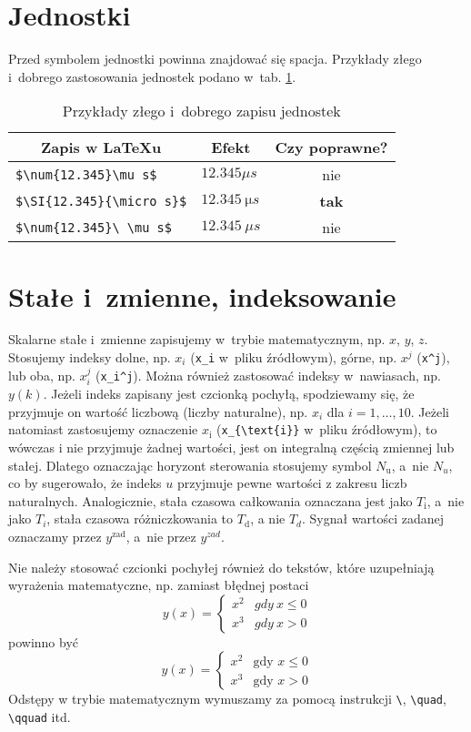 \section{Jednostki}
Przed symbolem jednostki powinna znajdować się spacja. Przykłady złego i~dobrego zastosowania jednostek podano w~tab. \ref{t_jednostki}.

\begin{table}[H]
	\caption{Przykłady złego i~dobrego zapisu jednostek}
	\label{t_jednostki}
\centering
\begin{tabular}{llc}
	\multicolumn{1}{c}{Zapis w \LaTeX u} & \multicolumn{1}{c}{Efekt} & \multicolumn{1}{c}{Czy poprawne?} \\ \hline
	\verb+$\num{12.345}\mu s$+ & $\num{12.345}\mu s$ & nie \\
	\verb+$\SI{12.345}{\micro s}$+ & $\SI{12.345}{\micro s}$ & \textbf{tak} \\
	\verb+$\num{12.345}\ \mu s$+ & $\num{12.345}\ \mu s$ & nie \\
\end{tabular}
\end{table}

\section{Stałe i~zmienne, indeksowanie}
Skalarne stałe i~zmienne zapisujemy w~trybie matematycznym, np. $x$, $y$, $z$. Stosujemy indeksy dolne, np. $x_i$ (\verb|x_i| w~pliku źródłowym), górne, np. $x^j$ (\verb|x^j|), lub oba, np. $x_i^j$ (\verb|x_i^j|). Można również zastosować indeksy w~nawiasach, np. $y(k)$. Jeżeli indeks zapisany jest czcionką pochyłą, spodziewamy się, że przyjmuje on wartość liczbową (liczby naturalne), np. $x_i$ dla $i=1,\ldots,10$. Jeżeli natomiast zastosujemy oznaczenie $x_{\text{i}}$ (\verb|x_{\text{i}}| w~pliku źródłowym), to wówczas $\text{i}$ nie przyjmuje żadnej wartości, jest on integralną częścią zmiennej lub stałej. Dlatego oznaczając horyzont sterowania stosujemy symbol $N_{\text{u}}$, a~nie $N_u$, co by sugerowało, że indeks $u$ przyjmuje pewne wartości z zakresu liczb naturalnych. Analogicznie, stała czasowa całkowania oznaczana jest jako $T_{\text{i}}$, a~nie jako $T_i$, stała czasowa różniczkowania to $T_{\text{d}}$, a nie $T_d$. Sygnał wartości zadanej oznaczamy przez $y^{\text{zad}}$, a~nie przez $y^{zad}$.

Nie należy stosować czcionki pochyłej również do tekstów, które uzupełniają wyrażenia matematyczne, np. zamiast błędnej postaci
\begin{equation}
y(x)=
\begin{cases}
x^2 & gdy \ x\le 0\\
x^3 & gdy \ x>0
\end{cases}
\end{equation}
powinno być
\begin{equation}
y(x)=
\begin{cases}
x^2 & \text{gdy } x\le 0\\
x^3 & \text{gdy } x>0
\end{cases}
\end{equation}
Odstępy w trybie matematycznym wymuszamy za pomocą instrukcji \verb+\+, \verb+\quad+, \verb+\qquad+ itd.

